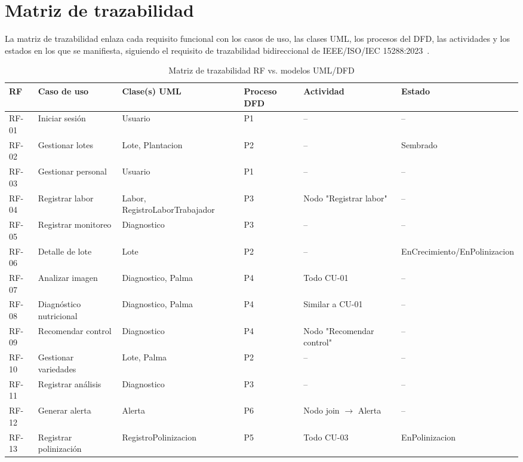 \documentclass[11pt,a4paper]{report}
\begin{document}
\section{Matriz de trazabilidad}

La matriz de trazabilidad enlaza cada requisito funcional con los casos de uso, las clases UML, los
procesos del DFD, las actividades y los estados en los que se manifiesta, siguiendo el requisito de
trazabilidad bidireccional de IEEE/ISO/IEC 15288:2023~\cite{ieee15288}.

\begin{landscape}
\begin{table}[htbp]
\centering
\footnotesize
\caption{Matriz de trazabilidad RF vs. modelos UML/DFD}
\label{tab:matriz-trazabilidad}
\begin{tabularx}{\linewidth}{|>{\hsize=0.5\hsize}X|>{\hsize=1.0\hsize}X|>{\hsize=1.0\hsize}X|>{\hsize=0.7\hsize}X|>{\hsize=0.7\hsize}X|>{\hsize=1.1\hsize}X|}
\hline
\textbf{RF} & \textbf{Caso de uso} & \textbf{Clase(s) UML} & \textbf{Proceso DFD} & \textbf{Actividad} & \textbf{Estado} \\
\hline
RF-01 & Iniciar sesión & Usuario & P1 & -- & -- \\
RF-02 & Gestionar lotes & Lote, Plantacion & P2 & -- & Sembrado \\
RF-03 & Gestionar personal & Usuario & P1 & -- & -- \\
RF-04 & Registrar labor & Labor, RegistroLaborTrabajador & P3 & Nodo "Registrar labor" & -- \\
RF-05 & Registrar monitoreo & Diagnostico & P3 & -- & -- \\
RF-06 & Detalle de lote & Lote & P2 & -- & EnCrecimiento/EnPolinizacion \\
RF-07 & Analizar imagen & Diagnostico, Palma & P4 & Todo CU-01 & -- \\
RF-08 & Diagnóstico nutricional & Diagnostico, Palma & P4 & Similar a CU-01 & -- \\
RF-09 & Recomendar control & Diagnostico & P4 & Nodo "Recomendar control" & -- \\
RF-10 & Gestionar variedades & Lote, Palma & P2 & -- & -- \\
RF-11 & Registrar análisis & Diagnostico & P3 & -- & -- \\
RF-12 & Generar alerta & Alerta & P6 & Nodo join $\rightarrow$ Alerta & -- \\
RF-13 & Registrar polinización & RegistroPolinizacion & P5 & Todo CU-03 & EnPolinizacion \\

\end{tabularx}
\end{table}
\end{landscape}
\end{document}
